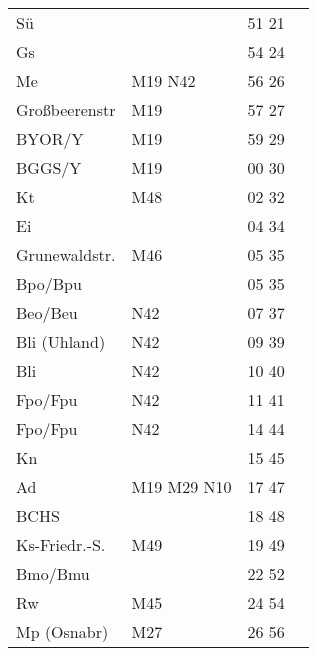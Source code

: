 \begin{tabular}{!{\color{schiefergrau}\vrule width 3pt}*{4}{l!{\color{schiefergrau}\vrule width 3pt}}}
Sü           &                                             & 51 21 &       \\
Gs           &                                             & 54 24 &       \\
Me           & \nusechs{} \mbus{} M19 \nbus{} N42          & 56 26 &       \\
Großbeerenstr& \mbus{} M19                                 & 57 27 &       \\
BYOR/Y       & \mbus{} M19                                 & 59 29 &       \\
BGGS/Y       & \mbus{} M19                                 & 00 30 &       \\
Kt           & \mbus{} M48                                 & 02 32 &       \\
Ei           &                                             & 04 34 &       \\
Grunewaldstr.& \mbus{} M46                                 & 05 35 &       \\
Bpo/Bpu      &                                             & 05 35 &       \\
Beo/Beu      & \nuneun{} \nbus{} N42                       & 07 37 &       \\
Bli (Uhland) & \nbus{} N42                                 & 09 39 &       \\
Bli          & \nbus{} N42                                 & 10 40 &       \\
Fpo/Fpu      & \nudrei{} \nbus{} N42                       & 11 41 &       \\
\hline
Fpo/Fpu      & \nudrei{} \nbus{} N42                       & 14 44 &       \\
Kn           &                                             & 15 45 &       \\
Ad           & \mbus{} M19 M29 \nbus{} N10                 & 17 47 &       \\
BCHS         &                                             & 18 48 &       \\
Ks-Friedr.-S.& \mbus{} M49                                 & 19 49 &       \\
Bmo/Bmu      & \nuzwei{}                                   & 22 52 &       \\
Rw           & \mbus{} M45                                 & 24 54 &       \\
Mp (Osnabr)  & \mbus{} M27                                 & 26 56 &       \\

\end{tabular}
